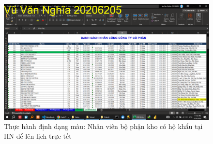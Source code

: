 \documentclass{article}
\begin{document}
\begin{figure}[h]
    \centering
    \includegraphics[scale = 0.15]{Video8/ThucHanh/6.png}
    \caption{Thực hành định dạng màu: Nhân viên bộ phận kho có hộ khẩu tại HN để lên lịch trực tết}
\end{figure}
\end{document}
